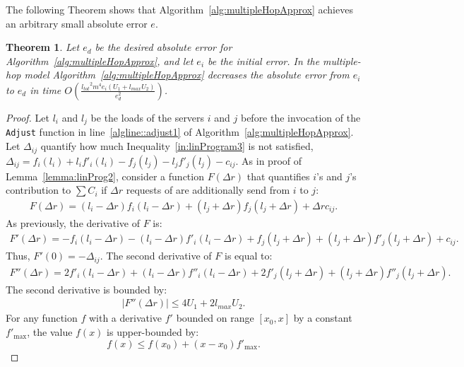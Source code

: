\documentclass[11pt]{article}
\newcommand{\ltot}{{{l_{\mathit{tot}}}}}
\newcommand{\lmax}{{{l_{\mathit{max}}}}}
\newtheorem{theorem}{Theorem}
\begin{document}
The following Theorem shows that Algorithm~\ref{alg:multipleHopApprox} achieves an arbitrary small absolute error $e$.


\begin{theorem}\label{thm:approxQuality}
Let $e_d$ be the desired absolute error for Algorithm~\ref{alg:multipleHopApprox}, and let $e_i$ be the initial error. In the multiple-hop model Algorithm~\ref{alg:multipleHopApprox} decreases the absolute error from $e_i$ to $e_d$ in time $O(\frac{\ltot^2m^4e_i(U_1 + \lmax U_2)}{e_d^2})$.
\end{theorem}
\begin{proof}
Let $l_i$ and $l_j$ be the loads of the servers $i$ and $j$ before the invocation of the \texttt{Adjust} function in line~\ref{algline::adjust1} of Algorithm~\ref{alg:multipleHopApprox}.
Let $\Delta_{ij}$ quantify how much Inequality~\ref{in:linProgram3} is not satisfied, $\Delta_{ij} =  f_{i}(l_i) + l_if'_{i}(l_i) - f_{j}(l_j) - l_jf'_{j}(l_j) - c_{ij}$.
As in proof of Lemma~\ref{lemma:linProg2}, consider a function $F(\Delta r)$ that quantifies $i$'s and $j$'s contribution to $\sum{C_i}$ if $\Delta r$ requests of are additionally send from $i$ to $j$:
\begin{align*}
F(\Delta r) = (l_i - \Delta r)f_{i}(l_i - \Delta r) + (l_j + \Delta r)f_{j}(l_j + \Delta r) + \Delta r c_{ij} \text{.}
\end{align*}
As previously, the derivative of $F$ is:
\begin{align*}
F'(\Delta r) = -f_{i}(l_i - \Delta r) - (l_i - \Delta r)f'_{i}(l_i - \Delta r)  + f_{j}(l_j + \Delta r) + (l_j + \Delta r)f'_{j}(l_j + \Delta r) + c_{ij} \text{.}
\end{align*}
Thus, $F'(0) = -\Delta_{ij}$.
The second derivative of $F$ is equal to:
\begin{align*}
F''(\Delta r) = 2f'_{i}(l_i - \Delta r) + (l_i - \Delta r)f''_{i}(l_i - \Delta r) + 2f'_{j}(l_j + \Delta r) + (l_j + \Delta r)f''_{j}(l_j + \Delta r) \text{.}
\end{align*}
The second derivative is bounded by:
\begin{align}
|F''(\Delta r)| \leq 4U_1 + 2\lmax U_2 \text{.} \label{eq:der2-upperbounded}
\end{align}
For any function $f$ with a derivative $f'$ bounded on range $[x_0, x]$ by a constant $f'_{\max}$, the value $f(x)$ is upper-bounded by:
\begin{equation}
f(x) \leq f(x_0) + (x - x_0) f'_{\max} \text{.} \label{eq:der-upperbound}
\end{equation}

\end{proof}
\end{document}
